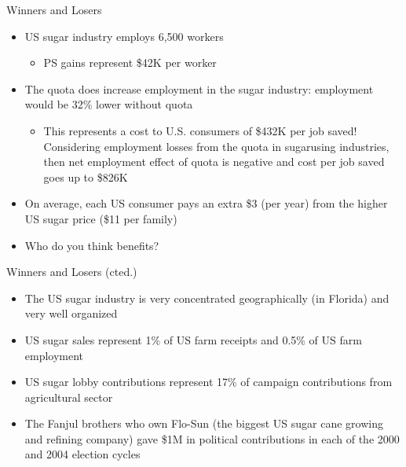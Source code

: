 \documentclass[10pt,hyperref={CJKbookmarks=true},xcolor=dvipsnames,aspectratio=169]{beamer}
\begin{document}
\begin{frame}{Winners and Losers}

\begin{itemize}
\item US sugar industry employs 6,500 workers 

\begin{itemize}
\item PS gains represent \$42K per worker 
\end{itemize}
\item The quota does increase employment in the sugar industry: employment
would be 32\% lower without quota 

\begin{itemize}
\item This represents a cost to U.S. consumers of \$432K per job saved!
 Considering employment losses from the quota in sugarusing industries,
then net employment effect of quota is negative and cost per job saved
goes up to \$826K 
\end{itemize}
\item On average, each US consumer pays an extra \$3 (per year) from the
higher US sugar price (\$11 per family) 
\item Who do you think benefits?
\end{itemize}
\end{frame}

\begin{frame}{Winners and Losers (cted.)}

\begin{itemize}
\item The US sugar industry is very concentrated geographically (in Florida)
and very well organized 
\item US sugar sales represent 1\% of US farm receipts and 0.5\% of US farm
employment 
\item US sugar lobby contributions represent 17\% of campaign contributions
from agricultural sector 
\item The Fanjul brothers who own Flo-Sun (the biggest US sugar cane growing
and refining company) gave \$1M in political contributions in each
of the 2000 and 2004 election cycles
\end{itemize}
\end{frame}
\end{document}
